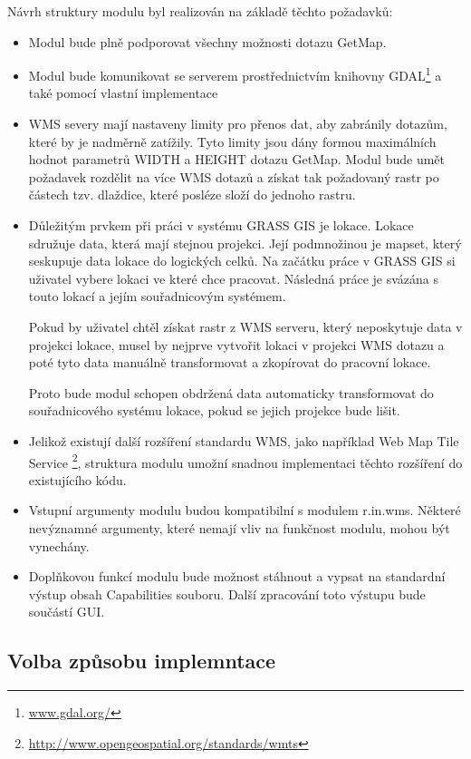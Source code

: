 \documentclass[a4paper,12pt]{article}
\begin{document}
Návrh struktury modulu byl realizován na základě těchto požadavků:
\begin{itemize}
  \item Modul bude plně podporovat všechny možnosti dotazu GetMap.
  \item Modul bude komunikovat se serverem prostřednictvím knihovny GDAL\footnote{\url{www.gdal.org/}}  a také pomocí vlastní implementace 
  \item WMS severy mají nastaveny limity pro přenos dat, aby zabránily dotazům, které by je nadměrně zatížily. Tyto limity jsou dány formou maximálních hodnot parametrů WIDTH a HEIGHT dotazu GetMap. 
        Modul bude umět požadavek rozdělit na více WMS dotazů a získat tak požadovaný rastr po částech tzv. dlaždice, které posléze složí do jednoho rastru.
  \item Důležitým prvkem při práci v systému GRASS GIS je lokace. Lokace sdružuje data, která mají stejnou projekci. Její podmnožinou je mapset, který seskupuje data lokace do logických celků. 
        Na začátku práce v GRASS GIS si uživatel vybere lokaci ve které chce pracovat. Následná práce je svázána s touto lokací a jejím souřadnicovým systémem.
 
        Pokud by uživatel chtěl získat rastr z WMS serveru, který neposkytuje data v projekci lokace,  musel by nejprve vytvořit lokaci v projekci WMS dotazu a poté tyto data manuálně transformovat a zkopírovat do pracovní lokace.
	
	Proto bude modul schopen obdržená data automaticky transformovat  do souřadnicového systému lokace, pokud se jejich projekce bude lišit. 
  \item Jelikož existují další rozšíření standardu WMS, jako například Web Map Tile Service \footnote{\url{http://www.opengeospatial.org/standards/wmts}}, struktura modulu umožní snadnou implementaci 
        těchto rozšíření do existujícího kódu. 
  \item Vstupní argumenty modulu budou kompatibilní s modulem r.in.wms. Některé nevýznamné argumenty, které nemají vliv na funkčnost modulu, mohou být vynechány.
  \item Doplňkovou funkcí modulu bude možnost stáhnout a vypsat na standardní výstup obsah Capabilities souboru. Další zpracování toto výstupu bude součástí GUI.  
 \end{itemize}



\subsection{Volba způsobu implemntace}
\end{document}
